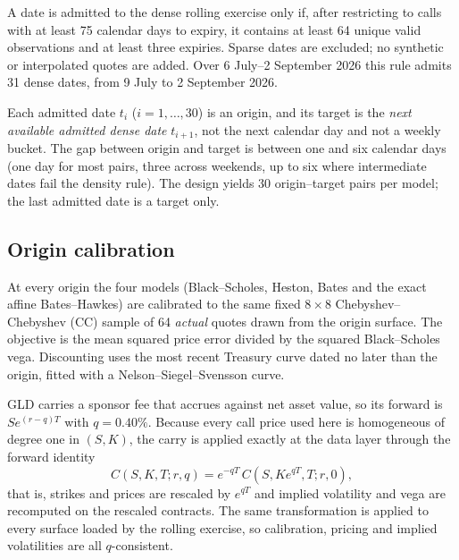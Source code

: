 A date is admitted to the dense rolling exercise only if, after restricting to
calls with at least 75 calendar days to expiry, it contains at least 64 unique
valid observations and at least three expiries.  Sparse dates are excluded;
no synthetic or interpolated quotes are added.  Over 6 July--2 September 2026
this rule admits 31 dense dates, from 9 July to 2 September 2026.

Each admitted date $t_i$ ($i=1,\dots,30$) is an origin, and its target is the
\emph{next available admitted dense date} $t_{i+1}$, not the next calendar day
and not a weekly bucket.  The gap between origin and target is between one
and six calendar days (one day for most pairs, three across weekends, up to
six where intermediate dates fail the density rule).  The design yields 30
origin--target pairs per model; the last admitted date is a target only.

\subsection{Origin calibration}
\label{subsec:oos_calibration}

At every origin the four models (Black--Scholes, Heston, Bates and the exact
affine Bates--Hawkes) are calibrated to the same fixed $8\times 8$
Chebyshev--Chebyshev (CC) sample of 64 \emph{actual} quotes drawn from the
origin surface.  The objective is the mean squared price error divided by the
squared Black--Scholes vega.  Discounting uses the most recent Treasury curve
dated no later than the origin, fitted with a Nelson--Siegel--Svensson curve.

GLD carries a sponsor fee that accrues against net asset value, so its forward
is $S e^{(r-q)T}$ with $q = 0.40\%$.  Because every call price used here is
homogeneous of degree one in $(S,K)$, the carry is applied exactly at the data
layer through the forward identity
\begin{equation}
    C(S,K,T;r,q) = e^{-qT}\,C\!\left(S, K e^{qT}, T; r, 0\right),
\end{equation}
that is, strikes and prices are rescaled by $e^{qT}$ and implied volatility
and vega are recomputed on the rescaled contracts.  The same transformation is
applied to every surface loaded by the rolling exercise, so calibration,
pricing and implied volatilities are all $q$-consistent.

